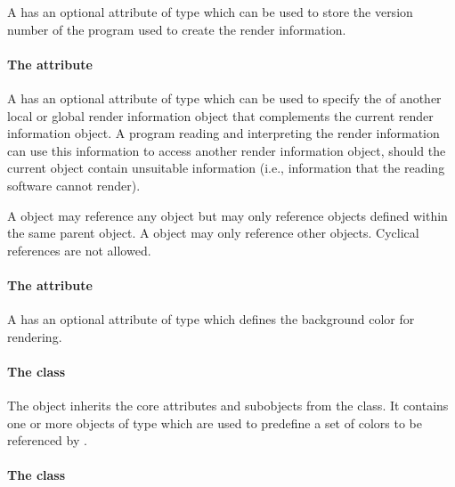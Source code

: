 A \RenderInformationBase has an optional attribute
 of type  which can be used to store 
the version number of the program used to create the render information.

\paragraph{The \fixttspace{} attribute}

A \RenderInformationBase has an optional attribute
 of type  which can be used to 
specify the  of another local or global render information object 
that complements the current render information object. A program reading and 
interpreting the render information can use this information to access another 
render information object, should the current object contain unsuitable information (i.e., information that the reading software cannot render). 

A \LocalRenderInformation object may reference any 
\GlobalRenderInformation object but may only reference \LocalRenderInformation objects defined within the same parent  object. 
A \GlobalRenderInformation object may only reference other \GlobalRenderInformation objects. Cyclical references are not allowed.


\paragraph{The \fixttspace{} attribute}

A \RenderInformationBase has an optional attribute
 of type  which defines the background 
color for rendering.

\paragraph{The  class}
\label{listofcolordefinitions-class}

The \ListOfColorDefinitions object
inherits the core attributes and subobjects from the 
class. It contains one or more objects of type \ColorDefinition which are used to predefine a set of colors to be referenced by \Styles. 

\paragraph{The  class}
\label{listofgradientdefinitions-class}

